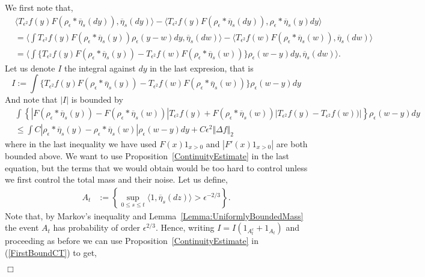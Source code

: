 \documentclass[12pt]{article}
\newenvironment {proof}{{\noindent\bf Proof }}{\hfill $\Box$ \medskip}
\begin{document}
\begin{proof}
We first note that,
\begin{align*}
    &\langle T_{\epsilon^2} f(y) F(\rho_\epsilon *\overline{\eta}_s(dy)), \overline{\eta}_s(dy) \rangle - \langle T_{\epsilon^2} f(y) F(\rho_\epsilon * \overline{\eta}_s(dy)), \rho_\epsilon * \overline{\eta}_s(y) dy \rangle \\ & = \langle \int T_{\epsilon^2} f(y) F(\rho_\epsilon * \overline{\eta}_s(y))\rho_\epsilon(y-w) dy, \overline{\eta}_s(dw)\rangle - \langle T_{\epsilon^2} f(w) F(\rho_\epsilon*\overline{\eta}_s(w)), \overline{\eta}_s(dw) \rangle \\ &= \langle \int \{ T_{\epsilon^2} f(y) F(\rho_\epsilon*\overline{\eta}_s(y))-T_{\epsilon^2}f(w) F(\rho_\epsilon*\overline{\eta}_s(w))\} \rho_\epsilon(w-y)dy, \overline{\eta}_s(dw) \rangle.
\end{align*}
Let us denote $I$ the integral against $dy$ in the last expresion, that is 
\[ I :=  \int \{ T_{\epsilon^2} f(y) F(\rho_\epsilon*\overline{\eta}_s(y))-T_{\epsilon^2}f(w) F(\rho_\epsilon*\overline{\eta}_s(w))\} \rho_\epsilon(w-y)dy \]
And note that $|I|$ is bounded by
\begin{align}
& \int \left\{ |F(\rho_\epsilon*\overline{\eta}_s(y))-F(\rho_\epsilon*\overline{\eta}_s(w))|T_{\epsilon^2}f(y)+F(\rho_\epsilon*\overline{\eta}_s(w))|T_{\epsilon^2}f(y)-T_{\epsilon^2}f(w))|\right\} \rho_{\epsilon}(w-y)dy \nonumber \\ &\leq \int C |\rho_\epsilon*\overline{\eta}_s(y)-\rho_\epsilon*\overline{\eta}_s(w)| \rho_\epsilon(w-y)dy + C \epsilon^2 \Vert \Delta f \Vert_2 \label{FirstBoundCT}
\end{align}
where in the last inequality we have used $F(x)1_{x>0}$ and $|F'(x)1_{x>0}|$ are both bounded above. We want to use Proposition~\ref{ContinuityEstimate} in the last equation, but the terms that we would obtain would be too hard to control unless we first control the total mass and their noise. Let us define,
\begin{align*}
A_{t} &:= \left\{ \sup_{0 \leq s \leq t} \langle 1, \overline{\eta}_s(dz) \rangle > \epsilon^{-2/3} \right\}. \end{align*}
Note that, by Markov's inequality and Lemma~\ref{Lemma:UniformlyBoundedMass} the event $A_{t}$ has probability of order $\epsilon^{2/3}$. Hence, writing $I = I(1_{A^c_{t}} + 1_{A_{t}})$ and proceeding as before we can use Proposition~\ref{ContinuityEstimate} in (\ref{FirstBoundCT}) to get,
\begin{align}

\end{align}
\end{proof}
\end{document}
